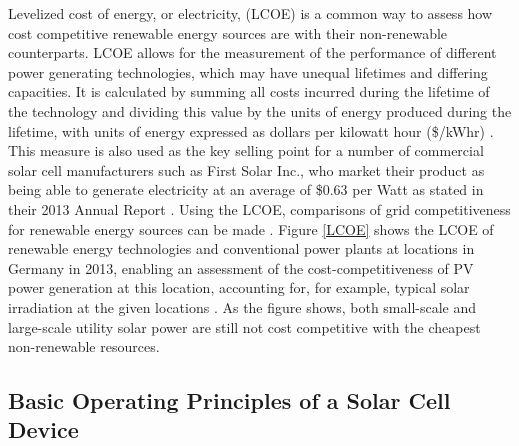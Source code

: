 Levelized cost of energy, or electricity, (LCOE) is a common way to assess how cost competitive renewable energy sources are with their non-renewable counterparts. LCOE allows for the measurement of the performance of different power generating technologies, which may have unequal lifetimes and differing capacities. It is calculated by summing all costs incurred during the lifetime of the technology and dividing this value by the units of energy produced during the lifetime, with units of energy expressed as dollars per kilowatt hour (\$/kWhr) \cite{LCOE2}. This measure is also used as the key selling point for a number of commercial solar cell manufacturers such as First Solar Inc., who market their product as being able to generate electricity at an average of \$0.63 per Watt as stated in their 2013  Annual Report \cite{first_solar}. Using the LCOE, comparisons of grid competitiveness for renewable energy sources can be made \cite{LCOE2}. Figure \ref{LCOE} shows the LCOE of renewable energy technologies and conventional power plants at locations in Germany in 2013, enabling an assessment of the cost-competitiveness of PV power generation at this location, accounting for, for example, typical solar irradiation at the given locations \cite{LCOE}. As the figure shows, both small-scale and large-scale utility solar power are still not cost competitive with the cheapest non-renewable resources.




\subsection{Basic Operating Principles of a Solar Cell Device}\label{basic_PV}


